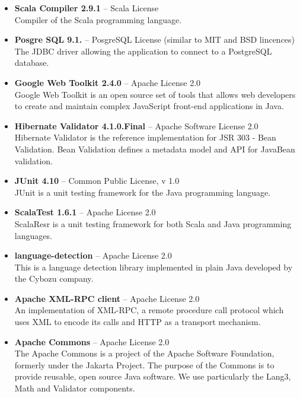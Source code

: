 \begin{itemize}
\item {\bf Scala Compiler 2.9.1} -- Scala License \\
Compiler of the Scala programming language.
\item {\bf Posgre SQL 9.1.} -- PosgreSQL License (similar to MIT and BSD lincences) \\
The JDBC driver allowing the application to connect to a PostgreSQL database.
\item {\bf Google Web Toolkit 2.4.0} -- Apache License 2.0 \\
Google Web Toolkit is an open source set of tools that allows web developers to create and maintain complex JavaScript front-end applications in Java.

\item {\bf Hibernate Validator 4.1.0.Final} -- Apache Software License 2.0 \\
Hibernate Validator is the reference implementation for JSR 303 - Bean Validation. Bean Validation defines a metadata model and API for JavaBean validation.


\item {\bf JUnit 4.10} -- Common Public License, v 1.0 \\
JUnit is a unit testing framework for the Java programming language.

\item {\bf ScalaTest 1.6.1} -- Apache License 2.0 \\
ScalaResr is a unit testing framework for both Scala and Java programming languages.

\item {\bf language-detection} -- Apache License 2.0 \\
This is a language detection library implemented in plain Java developed by the Cybozu company.

\item {\bf Apache XML-RPC client} -- Apache License 2.0  \\
An implementation of XML-RPC, a remote procedure call protocol which uses XML to encode its calls and HTTP as a transport mechanism.

\item {\bf Apache Commons} -- Apache License 2.0 \\
The Apache Commons is a project of the Apache Software Foundation, formerly under the Jakarta Project. The purpose of the Commons is to provide reusable, open source Java software. We use particularly the Lang3, Math and Validator components.


\end{itemize}
